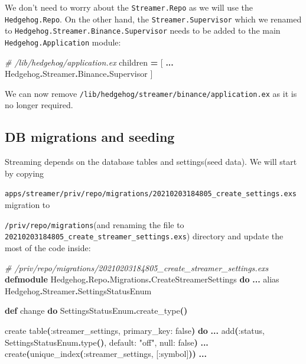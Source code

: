 \documentclass[
  oneside]{book}
\newenvironment{Shaded}{\begin{snugshade}}{\end{snugshade}}
\newcommand{\CommentTok}[1]{\textcolor[rgb]{0.56,0.35,0.01}{\textit{#1}}}
\newcommand{\ConstantTok}[1]{\textcolor[rgb]{0.56,0.35,0.01}{#1}}
\newcommand{\FunctionTok}[1]{\textcolor[rgb]{0.13,0.29,0.53}{\textbf{#1}}}
\newcommand{\ImportTok}[1]{#1}
\newcommand{\KeywordTok}[1]{\textcolor[rgb]{0.13,0.29,0.53}{\textbf{#1}}}
\newcommand{\NormalTok}[1]{#1}
\newcommand{\OperatorTok}[1]{\textcolor[rgb]{0.81,0.36,0.00}{\textbf{#1}}}
\newcommand{\OtherTok}[1]{\textcolor[rgb]{0.56,0.35,0.01}{#1}}
\newcommand{\StringTok}[1]{\textcolor[rgb]{0.31,0.60,0.02}{#1}}
\newcommand{\VariableTok}[1]{\textcolor[rgb]{0.00,0.00,0.00}{#1}}
\begin{document}
We don't need to worry about the \texttt{Streamer.Repo} as we will use the \texttt{Hedgehog.Repo}. On the other hand, the \texttt{Streamer.Supervisor} which we renamed to \texttt{Hedgehog.Streamer.Binance.Supervisor} needs to be added to the main \texttt{Hedgehog.Application} module:

\begin{Shaded}
\begin{Highlighting}[]
\CommentTok{\# /lib/hedgehog/application.ex}
\NormalTok{    children }\OperatorTok{=} \OtherTok{[}
      \OperatorTok{...}
      \ConstantTok{Hedgehog}\OperatorTok{.}\ConstantTok{Streamer}\OperatorTok{.}\ConstantTok{Binance}\OperatorTok{.}\ConstantTok{Supervisor}
    \OtherTok{]}
\end{Highlighting}
\end{Shaded}

We can now remove \texttt{/lib/hedgehog/streamer/binance/application.ex} as it is no longer required.

\subsection{DB migrations and seeding}\label{db-migrations-and-seeding}

Streaming depends on the database tables and settings(seed data). We will start by copying

\texttt{apps/streamer/priv/repo/migrations/20210203184805\_create\_settings.exs} migration to

\texttt{/priv/repo/migrations}(and renaming the file to \texttt{20210203184805\_create\_streamer\_settings.exs}) directory and update the most of the code inside:

\begin{Shaded}
\begin{Highlighting}[]
\CommentTok{\# /priv/repo/migrations/20210203184805\_create\_streamer\_settings.exs}
\KeywordTok{defmodule} \ConstantTok{Hedgehog}\OperatorTok{.}\ConstantTok{Repo}\OperatorTok{.}\ConstantTok{Migrations}\OperatorTok{.}\ConstantTok{CreateStreamerSettings} \KeywordTok{do}
  \OperatorTok{...}
  \ImportTok{alias} \ConstantTok{Hedgehog}\OperatorTok{.}\ConstantTok{Streamer}\OperatorTok{.}\ConstantTok{SettingsStatusEnum}

  \KeywordTok{def}\NormalTok{ change }\KeywordTok{do}
    \ConstantTok{SettingsStatusEnum}\OperatorTok{.}\NormalTok{create\_type}\FunctionTok{()}

\NormalTok{    create table}\FunctionTok{(}\VariableTok{:streamer\_settings}\NormalTok{, }\VariableTok{primary\_key:} \ConstantTok{false}\FunctionTok{)} \KeywordTok{do}
      \OperatorTok{...}
\NormalTok{      add}\FunctionTok{(}\VariableTok{:status}\NormalTok{, }\ConstantTok{SettingsStatusEnum}\OperatorTok{.}\NormalTok{type}\FunctionTok{()}\NormalTok{, }\VariableTok{default:} \StringTok{"off"}\NormalTok{, }\VariableTok{null:} \ConstantTok{false}\FunctionTok{)}
    \OperatorTok{...}
\NormalTok{    create}\FunctionTok{(}\NormalTok{unique\_index}\FunctionTok{(}\VariableTok{:streamer\_settings}\NormalTok{, }\OtherTok{[}\VariableTok{:symbol}\OtherTok{]}\FunctionTok{))}
  \OperatorTok{...}
\end{Highlighting}
\end{Shaded}
\end{document}
